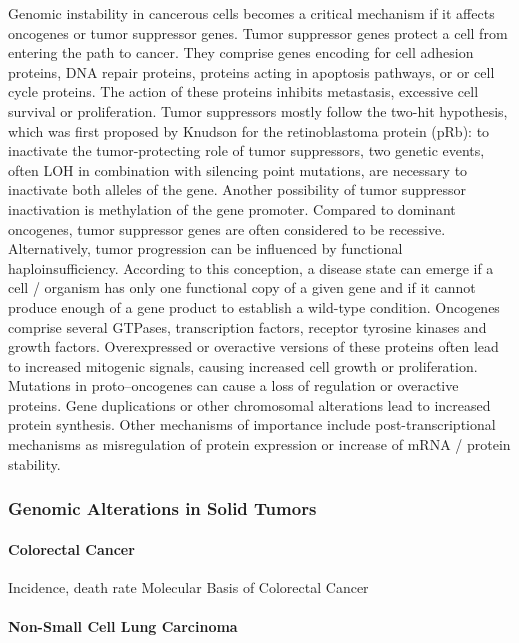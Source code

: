     Genomic instability in cancerous cells becomes a critical mechanism if it
    affects oncogenes or tumor suppressor genes. Tumor suppressor genes protect
    a cell from entering the path to cancer. They comprise
    genes encoding for cell adhesion proteins,  DNA repair proteins, proteins
    acting in apoptosis pathways, or or cell cycle proteins. The action of these
    proteins inhibits metastasis, excessive cell survival or proliferation. Tumor
    suppressors mostly follow the two-hit hypothesis, which was first proposed
    by Knudson  for the retinoblastoma protein (pRb): to inactivate the
    tumor-protecting role of tumor suppressors, two genetic events,
    often LOH in  combination with silencing point mutations, are necessary to
    inactivate both alleles of the gene. Another possibility of tumor
    suppressor inactivation is methylation of the gene promoter. Compared to
    dominant oncogenes, tumor suppressor genes are often considered to be
    recessive. Alternatively, tumor progression can be influenced by functional
    haploinsufficiency. According to this conception, a disease state can emerge
    if a cell / organism has only one functional  copy of a given gene and if it
    cannot  produce enough of a gene product to establish a wild-type condition.
    Oncogenes comprise several GTPases, transcription factors, receptor tyrosine
    kinases and growth factors. Overexpressed or overactive versions of these
    proteins often lead to increased mitogenic signals, causing increased
    cell growth or proliferation. Mutations in proto--oncogenes can cause a
    loss of regulation or overactive proteins. Gene duplications or other
    chromosomal alterations lead to increased protein synthesis. Other
    mechanisms of importance include post-transcriptional mechanisms as
    misregulation of protein expression or increase of mRNA / protein stability.

    \subsubsection{Genomic Alterations in Solid Tumors}

      \paragraph{Colorectal Cancer}

        Incidence, death rate
        Molecular Basis of Colorectal Cancer

      \paragraph{Non-Small Cell Lung Carcinoma}

